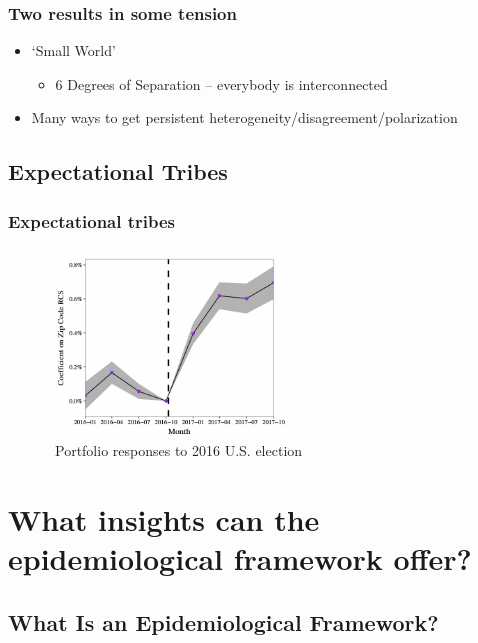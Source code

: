 \documentclass[pdflatex]{beamer}
\begin{document}
\begin{frame}\frametitle{Two results in some tension}

    \begin{itemize}
        \item `Small World'
        \begin{itemize}
            \item 6 Degrees of Separation -- everybody is interconnected
        \end{itemize}
        \item Many ways to get persistent heterogeneity/disagreement/polarization
    \end{itemize}

\end{frame}

\subsection{Expectational Tribes}\label{subsec:ExpTribes}

\begin{frame}
		\frametitle{Expectational tribes}
\begin{figure}[!ht] \centering  %
	\caption{ ~Portfolio responses to 2016 U.S. election}
	\label{fig:parker}
	\centerline{\includegraphics[width=0.6\textwidth]{./figures/parker.png}}
\end{figure}
\end{frame}
\section{What insights can the epidemiological framework
	offer?}\label{what-insights-can-the-epidemiological-framework-offer}



\subsection{What Is an Epidemiological Framework?}
\label{subsec: epi_framework}
\end{document}
